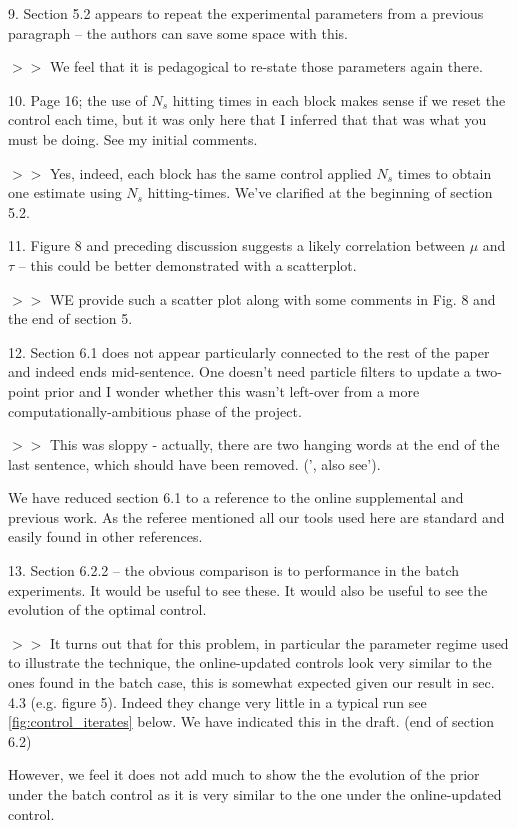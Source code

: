 \documentclass[12pt]{article}
\begin{document}
9. Section 5.2 appears to repeat the experimental parameters from a previous
paragraph -- the authors can save some space with this. 

$>>$ We feel that it is pedagogical to re-state those parameters again there.  

10. Page 16; the use of $N_s$ hitting times in each block makes sense if we
reset the control each time, but it was only here that I inferred that that was what
you must be doing. See my initial comments.

$>>$ Yes, indeed, each block has the same control applied $N_s$ times to obtain
one estimate using $N_s$ hitting-times. We've clarified at the beginning of
section 5.2. 

11. Figure 8 and preceding discussion suggests a likely correlation between
$\mu$ and $\tau$ -- this could be better demonstrated with a scatterplot.

$>>$ WE provide such a scatter plot along with some comments in Fig. 8 and the
end of section 5.

12. Section 6.1 does not appear particularly connected to the rest of the paper
and indeed ends mid-sentence. One doesn't need particle filters to update a
two-point prior and I wonder whether this wasn't left-over from a more
computationally-ambitious phase of the project.

$>>$ This was sloppy - actually, there are two hanging words at the end of the
last sentence, which should have been removed. (', also see'). 

We have reduced section 6.1 to a reference to the online supplemental and
previous work. As the referee mentioned all our tools used here are standard and
easily found in other references. 
\clearpage

13. Section 6.2.2 -- the obvious comparison is to performance in the batch
experiments. It would be useful to see these. It would also be useful to see the
evolution of the optimal control.
 
$>>$
It turns out that for this problem, in particular the parameter regime used to
illustrate the technique, the online-updated controls look very similar to the
ones found in the batch case, this is somewhat expected given our result in sec.
4.3 (e.g. figure 5). 
Indeed they change very little in a typical run see \cref{fig:control_iterates}
below. We have indicated this in the draft. (end of section 6.2)

However, we feel it does not add much to show the the evolution of the prior
under the batch control as it is very similar to the one under the
online-updated control. 
\end{document}
